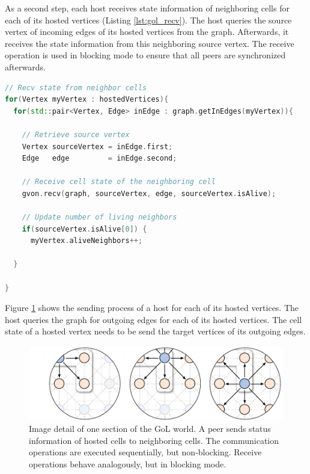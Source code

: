 \noindent As a second step, each host receives state information of
neighboring cells for each of its hosted vertices (Listing
\ref{lst:gol_recv}). The host queries the source vertex of incoming
edges of its hosted vertices from the graph. Afterwards, it receives
the state information from this neighboring source vertex.  The
receive operation is used in blocking mode to ensure that all peers
are synchronized afterwards.

\begin{lstlisting}[language=C++, label=lst:gol_recv, caption={\ }]
// Recv state from neighbor cells
for(Vertex myVertex : hostedVertices){
  for(std::pair<Vertex, Edge> inEdge : graph.getInEdges(myVertex)){

    // Retrieve source vertex
    Vertex sourceVertex = inEdge.first;
    Edge   edge         = inEdge.second;

    // Receive cell state of the neighboring cell    
    gvon.recv(graph, sourceVertex, edge, sourceVertex.isAlive);

    // Update number of living neighbors
    if(sourceVertex.isAlive[0]) { 
      myVertex.aliveNeighbors++;

  }

}
\end{lstlisting}

\noindent Figure \ref{fig:gol_communication} shows the sending process
of a host for each of its hosted vertices. The host queries the graph
for outgoing edges for each of its hosted vertices. The cell state of
a hosted vertex needs to be send the target vertices of its outgoing
edges.

\begin{figure}[H]
  \centering
  \includegraphics[width=\textwidth]{graphics/40_gol_communication}
  \caption{Image detail of one section of the GoL world. A peer sends status information of
    hosted cells to neighboring cells. The communication operations
    are executed sequentially, but non-blocking. Receive operations
    behave analogously, but in blocking mode.}
  \label{fig:gol_communication}
\end{figure}

